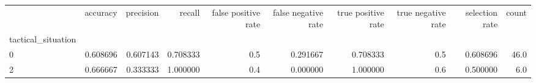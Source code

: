 \begin{tabular}{lrrrrrrrrr}
\toprule
{} &  accuracy &  precision &    recall &  false positive rate &  false negative rate &  true positive rate &  true negative rate &  selection rate &  count \\
tactical\_situation &           &            &           &                      &                      &                     &                     &                 &        \\
\midrule
0                  &  0.608696 &   0.607143 &  0.708333 &                  0.5 &             0.291667 &            0.708333 &                 0.5 &        0.608696 &   46.0 \\
2                  &  0.666667 &   0.333333 &  1.000000 &                  0.4 &             0.000000 &            1.000000 &                 0.6 &        0.500000 &    6.0 \\
\bottomrule
\end{tabular}
